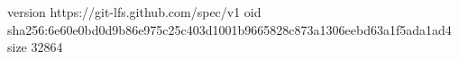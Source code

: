version https://git-lfs.github.com/spec/v1
oid sha256:6e60e0bd0d9b86e975c25c403d1001b9665828c873a1306eebd63a1f5ada1ad4
size 32864
